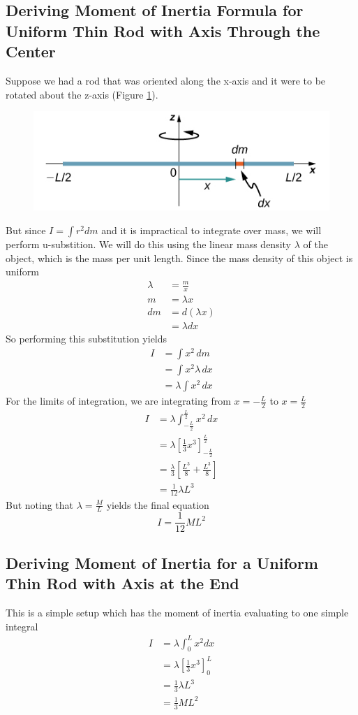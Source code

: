 \subsection{Deriving Moment of Inertia Formula for Uniform Thin Rod with Axis Through the Center}
Suppose we had a rod that was oriented along the x-axis and it were to be rotated about the z-axis
(Figure \ref{fig:rod-moment-of-inertia}). 
\begin{figure}[ht!]
    \centering
    \includegraphics[width=0.4 \textwidth]{../figures/rod moment of inertia.png}
    \caption{}
    \label{fig:rod-moment-of-inertia}
\end{figure}
But since $I=\int r^2dm$ and it is impractical to integrate over mass, we will perform u-substition.
We will do this using the linear mass density $\lambda$ of the object, which is the mass per unit
length. Since the mass density of this object is uniform
\begin{align*}
    \lambda&= \frac{m}{x}\\
    m&=\lambda x\\
    dm&=d(\lambda x)\\
    &=\lambda dx
\end{align*}
So performing this substitution yields
\begin{align*}
    I&=\int x^2\,dm\\
    &=\int x^2\lambda\,dx\\
    &=\lambda\int x^2\,dx
\end{align*}
For the limits of integration, we are integrating from $x=-\frac{L}{2}$ to $x=\frac{L}{2}$
\begin{align*}
    I&=\lambda\int_{-\frac{L}{2}}^{\frac{L}{2}}x^2\,dx\\
    &=\lambda \left[\frac{1}{3}x^3\right]_{-\frac{L}{2}}^{\frac{L}{2}}\\
    &=\frac{\lambda}{3}\left[\frac{L^3}{8}+\frac{L^3}{8}\right]\\
    &=\frac{1}{12}\lambda L^3
\end{align*}
But noting that $\lambda=\frac{M}{L}$ yields the final equation
\[
    I=\frac{1}{12}ML^2
\]

\subsection{Deriving Moment of Inertia for a Uniform Thin Rod with Axis at the End}
This is a simple setup which has the moment of inertia evaluating to one simple integral
\begin{align*}
    I&=\lambda\int_0^Lx^2dx\\
    &=\lambda \left[\frac{1}{3}x^3\right]_0^L\\
    &=\frac{1}{3}\lambda L^3\\
    &=\frac{1}{3}ML^2
\end{align*}

